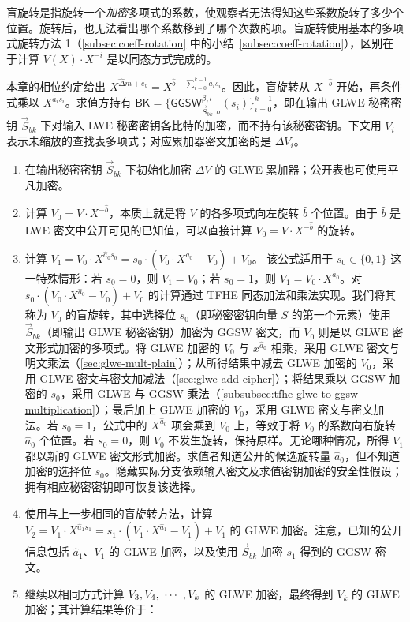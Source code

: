 盲旋转是指旋转一个\textit{加密}多项式的系数，使观察者无法得知这些系数旋转了多少个位置。旋转后，也无法看出哪个系数移到了哪个次数的项。盲旋转使用基本的多项式旋转方法 1（\autoref{subsec:coeff-rotation} 中的小结~\ref*{subsec:coeff-rotation}），区别在于计算 $V(X)\cdot X^{-i}$ 是以同态方式完成的。

本章的相位约定给出 $X^{\hat\Delta m+\hat e_b}=X^{\hat b-\sum_{i=0}^{k-1}\hat a_i s_i}$。因此，盲旋转从 $X^{-\hat b}$ 开始，再条件式乘以 $X^{\hat a_i s_i}$。求值方持有 $\textsf{BK}=\{\textsf{GGSW}_{\vec S_{bk},\sigma}^{\beta,l}(s_i)\}_{i=0}^{k-1}$，即在输出 GLWE 秘密密钥 $\vec S_{bk}$ 下对输入 LWE 秘密密钥各比特的加密，而不持有该秘密密钥。下文用 $V_i$ 表示未缩放的查找表多项式；对应累加器密文加密的是 $\Delta V_i$。

\begin{enumerate}
\item 在输出秘密密钥 $\vec S_{bk}$ 下初始化加密 $\Delta V$ 的 GLWE 累加器；公开表也可使用平凡加密。
\item 计算 $V_0 = V \cdot X^{-\hat{b}}$，本质上就是将 $V$ 的各多项式向左旋转 $\hat{b}$ 个位置。由于 $\hat{b}$ 是 LWE 密文中公开可见的已知值，可以直接计算 $V_0 = V \cdot X^{-\hat{b}}$ 的旋转。
\item 计算 $V_1 = V_0 \cdot X^{\hat{a}_0s_0} = s_0 \cdot (V_0 \cdot X^{\hat{a}_0} - V_0) + V_0$。
该公式适用于 $s_0 \in \{0, 1\}$ 这一特殊情形：若 $s_0 = 0$，则 $V_1 = V_0$；若 $s_0 = 1$，则 $V_1 = V_0 \cdot X^{\hat{a}_0}$。对 $s_0 \cdot (V_0 \cdot X^{\hat{a}_0} - V_0) + V_0$ 的计算通过 TFHE 同态加法和乘法实现。我们将其称为 $V_0$ 的盲旋转，其中选择位 $s_0$（即秘密密钥向量 $S$ 的第一个元素）使用 $\vec{S}_{bk}$（即输出 GLWE 秘密密钥）加密为 GGSW 密文，而 $V_0$ 则是以 GLWE 密文形式加密的多项式。将 GLWE 加密的 $V_0$ 与 $x^{\hat{a}_0}$ 相乘，采用 GLWE 密文与明文乘法（\autoref{sec:glwe-mult-plain}）；从所得结果中减去 GLWE 加密的 $V_0$，采用 GLWE 密文与密文加减法（\autoref{sec:glwe-add-cipher}）；将结果乘以 GGSW 加密的 $s_0$，采用 GLWE 与 GGSW 乘法（\autoref{subsubsec:tfhe-glwe-to-ggsw-multiplication}）；最后加上 GLWE 加密的 $V_0$，采用 GLWE 密文与密文加法。若 $s_0 = 1$，公式中的 $X^{\hat{a}_0}$ 项会乘到 $V_0$ 上，等效于将 $V_0$ 的系数向右旋转 $\hat{a}_0$ 个位置。若 $s_0 = 0$，则 $V_0$ 不发生旋转，保持原样。无论哪种情况，所得 $V_1$ 都以新的 GLWE 密文形式加密。求值者知道公开的候选旋转量 $\hat a_0$，但不知道加密的选择位 $s_0$。隐藏实际分支依赖输入密文及求值密钥加密的安全性假设；拥有相应秘密密钥即可恢复该选择。
\item 使用与上一步相同的盲旋转方法，计算 $V_2 = V_1 \cdot X^{\hat{a}_1s_1} = s_1 \cdot (V_1 \cdot X^{\hat{a}_1} - V_1) + V_1$ 的 GLWE 加密。注意，已知的公开信息包括 $\hat{a}_1$、$V_1$ 的 GLWE 加密，以及使用 $\vec{S}_{bk}$ 加密 $s_1$ 得到的 GGSW 密文。
\item 继续以相同方式计算 $V_3, V_4, \text{ } \text{$\cdots$} \text{ }, V_k$ 的 GLWE 加密，最终得到 $V_k$ 的 GLWE 加密；其计算结果等价于：


\end{enumerate}
